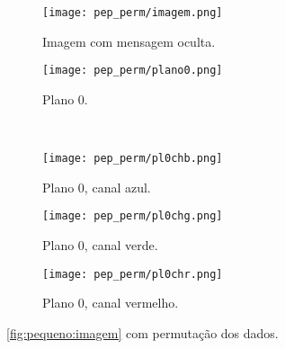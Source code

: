 \begin{figure}[H]
    \centering
    \begin{subfigure}{0.4\textwidth}
        \centering
        \texttt{[image: pep\_perm/imagem.png]}
        \caption{Imagem com mensagem oculta.}
        \label{fig:permtexto:imagem}
    \end{subfigure}%
    \begin{subfigure}{0.4\textwidth}
        \centering
        \texttt{[image: pep\_perm/plano0.png]}
        \caption{Plano 0.}
        \label{fig:permtexto:plano}
    \end{subfigure}\\[8pt]
    \begin{subfigure}{0.28\textwidth}
        \centering
        \texttt{[image: pep\_perm/pl0chb.png]}
        \caption{Plano 0, canal azul.}
        \label{fig:permtexto:blue}
    \end{subfigure}%
    \begin{subfigure}{0.28\textwidth}
        \centering
        \texttt{[image: pep\_perm/pl0chg.png]}
        \caption{Plano 0, canal verde.}
        \label{fig:permtexto:green}
    \end{subfigure}%
    \begin{subfigure}{0.28\textwidth}
        \centering
        \texttt{[image: pep\_perm/pl0chr.png]}
        \caption{Plano 0, canal vermelho.}
        \label{fig:permtexto:red}
    \end{subfigure}%

    \caption{\cref{fig:pequeno:imagem} com permutação dos dados.}
    \label{fig:permtexto}
\end{figure}